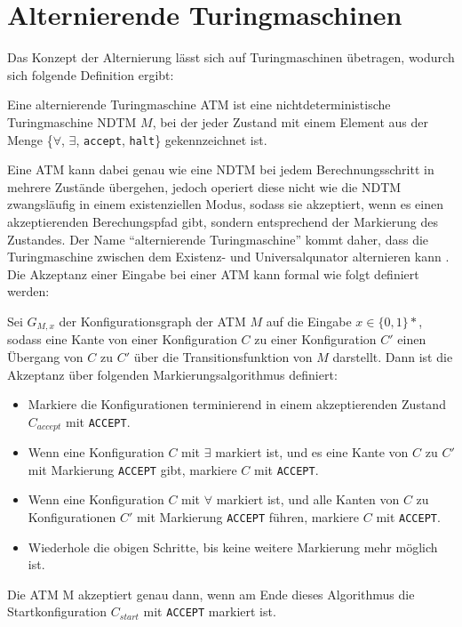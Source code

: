 \section{Alternierende Turingmaschinen} \label{section: alternierende Turingmaschine}
Das Konzept der Alternierung lässt sich auf Turingmaschinen übetragen, wodurch sich folgende Definition ergibt:
\begin{definition}\cite{sipser_introduction_2012}
    Eine alternierende Turingmaschine ATM ist eine nichtdeterministische Turingmaschine NDTM $M$, bei der jeder Zustand mit einem 
    Element aus der Menge \{$\forall$, $\exists$, \texttt{accept}, \texttt{halt}\} gekennzeichnet ist.
\end{definition}

Eine ATM kann dabei genau wie eine NDTM bei jedem Berechnungsschritt in mehrere Zustände übergehen, jedoch operiert diese nicht
wie die NDTM zwangsläufig in einem existenziellen Modus, sodass sie akzeptiert, wenn es einen akzeptierenden Berechungspfad gibt, sondern entsprechend der Markierung des Zustandes.
Der Name \enquote{alternierende Turingmaschine} kommt daher, dass die Turingmaschine zwischen dem Existenz- und Universalqunator alternieren kann \cite{chandra_alternation_1976}.
Die Akzeptanz einer Eingabe bei einer ATM kann formal wie folgt definiert werden:
\begin{definition}\cite{arora_computational_2009}
    Sei $G_{M, x}$ der Konfigurationsgraph der ATM $M$ auf die Eingabe $x \in \{0,1\}*$, sodass eine Kante von einer Konfiguration $C$ zu 
    einer Konfiguration $C'$ einen Übergang von $C$ zu $C'$ über die Transitionsfunktion von $M$ darstellt. Dann ist die Akzeptanz über folgenden
    Markierungsalgorithmus definiert:

    \begin{itemize}
        \item Markiere die Konfigurationen terminierend in einem akzeptierenden Zustand $C_{accept}$ mit \texttt{ACCEPT}.
    \end{itemize}
    \begin{itemize}        
        \item Wenn eine Konfiguration $C$ mit $\exists$ markiert ist, und es eine Kante von $C$ zu $C'$ mit Markierung \texttt{ACCEPT} gibt, markiere $C$ mit \texttt{ACCEPT}.
        \item Wenn eine Konfiguration $C$ mit $\forall$ markiert ist, und alle Kanten von $C$ zu Konfigurationen $C'$ mit Markierung \texttt{ACCEPT} führen, markiere $C$ mit \texttt{ACCEPT}.
        \item Wiederhole die obigen Schritte, bis keine weitere Markierung mehr möglich ist.
    \end{itemize}

    Die ATM M akzeptiert genau dann, wenn am Ende dieses Algorithmus die Startkonfiguration $C_{start}$ mit \texttt{ACCEPT} markiert ist.
\end{definition}
